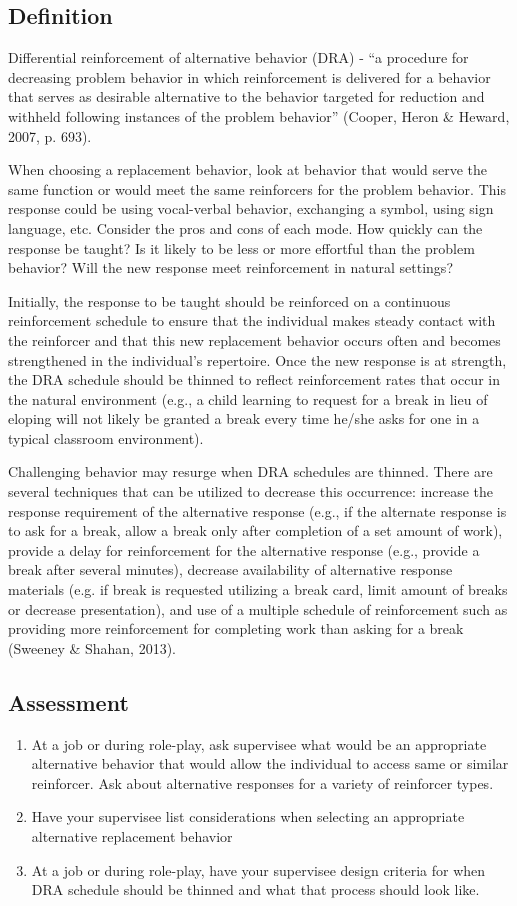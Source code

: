 \subsection{Definition}
Differential reinforcement of alternative behavior (DRA) -  ``a procedure for decreasing problem behavior in which reinforcement is delivered for a behavior that serves as desirable alternative to the behavior targeted for reduction and withheld following instances of the problem behavior'' (Cooper, Heron \& Heward, 2007, p. 693).  

When choosing a replacement behavior, look at behavior that would serve the same function or would meet the same reinforcers for the problem behavior. This response could be using vocal-verbal behavior, exchanging a symbol, using sign language, etc. Consider the pros and cons of each mode. How quickly can the response be taught? Is it likely to be less or more effortful than the problem behavior? Will the new response meet reinforcement in natural settings?

Initially, the response to be taught should be reinforced on a continuous reinforcement schedule to ensure that the individual makes steady contact with the reinforcer and that this new replacement behavior occurs often and becomes strengthened in the individual's repertoire. Once the new response is at strength, the DRA schedule should be thinned to reflect reinforcement rates that occur in the natural environment (e.g., a child learning to request for a break in lieu of eloping will not likely be granted a break every time he/she asks for one in a typical classroom environment). 

Challenging behavior may resurge when DRA schedules are thinned. There are several techniques that can be utilized to decrease this occurrence: increase the response requirement of the alternative response (e.g., if the alternate response is to ask for a break, allow a break only after completion of a set amount of work), provide a delay for reinforcement for the alternative response (e.g., provide a break after several minutes), decrease availability of alternative response materials (e.g. if break is requested utilizing a break card, limit amount of breaks or decrease presentation), and use of a multiple schedule of reinforcement such as providing more reinforcement for completing work than asking for a break (Sweeney \& Shahan, 2013). 
%
\subsection{Assessment}
\begin{enumerate}
\item At a job or during role-play, ask supervisee what would be an appropriate alternative behavior that would allow the individual to access same or similar reinforcer. Ask about alternative responses for a variety of reinforcer types.
\item Have your supervisee list considerations when selecting an appropriate alternative replacement behavior
\item At a job or during role-play, have your supervisee design criteria for when DRA schedule should be thinned and what that process should look like.
%
\end{enumerate}
%
